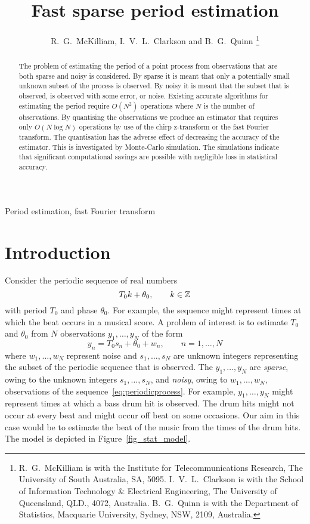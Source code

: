 \documentclass[10pt,twocolumn,twoside]{IEEEtran}
\title{Fast sparse period estimation}
\author{R.~G.~McKilliam, I.~V.~L.~Clarkson and B.~G.~Quinn    
\thanks{
R.~G.~McKilliam is with the Institute for Telecommunications Research, The University of South Australia, SA, 5095.  I.~V.~L.~Clarkson is with the School of Information Technology \& Electrical Engineering, The University of Queensland, QLD., 4072, Australia.  B.~G.~Quinn is with the Department of Statistics, Macquarie University, Sydney, NSW, 2109, Australia.
}}
\begin{document}
\maketitle

\begin{abstract}

The problem of estimating the period of a point process from observations that are both sparse and noisy is considered.  By sparse it is meant that only a potentially small unknown subset of the process is observed.  By noisy it is meant that the subset that is observed, is observed with some error, or noise.  Existing accurate algorithms for estimating the period require $O(N^2)$ operations where $N$ is the number of observations.  By quantising the observations we produce an estimator that requires only $O(N\log N)$ operations by use of the chirp z-transform or the fast Fourier transform.  The quantisation has the adverse effect of decreasing the accuracy of the estimator.  This is investigated by Monte-Carlo simulation.  The simulations indicate that significant computational savings are possible with negligible loss in statistical accuracy.

\end{abstract}
\begin{IEEEkeywords}
Period estimation, fast Fourier transform
\end{IEEEkeywords}

\section{Introduction}

Consider the periodic sequence of real numbers
\begin{equation}\label{eq:periodicprocess}
T_0 k + \theta_0, \qquad k \in {\mathbb Z}
\end{equation}
with period $T_0$ and phase $\theta_0$.  For example, the sequence might represent times at which the beat occurs in a musical score.  A problem of interest is to estimate $T_0$ and $\theta_0$ from $N$ observations $y_1,\dots,y_N$ of the form
\begin{equation} \label{eq:sigmodel}
y_n = T_0 s_n + \theta_0 + w_n, \qquad n = 1,\dots,N
\end{equation}
where $w_1,\dots,w_N$ represent noise and $s_1,\dots,s_N$ are unknown integers representing the subset of the periodic sequence that is observed.  The $y_1, \dots, y_N$ are \emph{sparse}, owing to the unknown integers $s_1,\dots,s_N$, and \emph{noisy}, owing to $w_1,\dots,w_N$, observations of the sequence~\eqref{eq:periodicprocess}.  For example, $y_1,\dots,y_N$ might represent times at which a bass drum hit is observed.  The drum hits might not occur at every beat and might occur off beat on some occasions.  Our aim in this case would be to estimate the beat of the music from the times of the drum hits.  The model is depicted in Figure~\ref{fig_stat_model}. %
\end{document}
